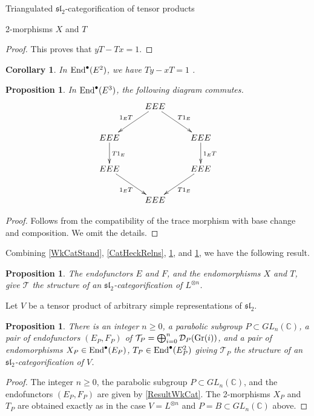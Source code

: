 \documentclass[12pt]{amsart}
\newtheorem{cor}[thm]{Corollary}
\newtheorem{prpn}[thm]{Proposition}
\theoremstyle{definition}
\theoremstyle{remark}
\theoremstyle{remark}
\begin{document}
\begin{section}{Triangulated $\mathfrak{sl}_{2}$-categorification of tensor products}
\begin{subsection}{2-morphisms $X$ and $T$}
\begin{proof}
This proves that $yT - Tx = 1$. 
\end{proof}

\begin{cor} \label{OtherReln} In ${\rm End}^{\bullet}(E^{2})$, we have $Ty - xT = 1$ . \end{cor}

\begin{prpn} \label{BraidReln} In ${\rm End}^{\bullet}(E^{3})$, the following diagram commutes. \[ \xymatrix{ & EEE \ar[dl]_{1_{E}T} \ar[dr]^{T1_{E}} & \\ EEE \ar[d]^{T1_{E}} & & EEE \ar[d]^{1_{E}T} \\ EEE \ar[dr]_{1_{E}T} & & EEE \ar[dl]^{T1_{E}} \\ & EEE & } \] \end{prpn}

\begin{proof} Follows from the compatibility of the trace morphism with base change and composition. We omit the details.   
\end{proof}

Combining \ref{WkCatStand}, \ref{CatHeckRelns}, \ref{OtherReln}, and \ref{BraidReln}, we have the following result. 

\begin{prpn} The endofunctors $E$ and $F$, and the endomorphisms $X$ and $T$, give $\mathcal{T}$ the structure of an $\mathfrak{sl}_{2}$-categorification of $L^{\otimes n}$. \end{prpn}

Let $V$ be a tensor product of arbitrary simple representations of $\mathfrak{sl}_{2}$.

\begin{prpn} \label{sl2Cat} There is an integer $n \geq 0$, a parabolic subgroup $P \subset GL_{n}(\mathbb{C})$, a pair of endofunctors $(E_{P},F_{P})$ of $\mathcal{T}_{P} = \bigoplus_{i=0}^{n} \mathcal{D}_{P}({\rm Gr}(i))$, and a pair of endomorphisms $X_{P} \in {\rm End}^{\bullet}(E_{P})$, $T_{P} \in {\rm End}^{\bullet}(E_{P}^{2})$ giving $\mathcal{T}_{P}$ the structure of an $\mathfrak{sl}_{2}$-categorification of $V$. 
\end{prpn} 

\begin{proof} The integer $n \geq 0$, the parabolic subgroup $P \subset GL_{n}(\mathbb{C})$, and the endofunctors $(E_{P},F_{P})$ are given by \ref{ResultWkCat}. The 2-morphisms $X_{P}$ and $T_{P}$ are obtained exactly as in the case $V=L^{\otimes n}$ and $P=B \subset GL_{n}(\mathbb{C})$ above. \end{proof}
\end{subsection}


\end{section}
\end{document}
